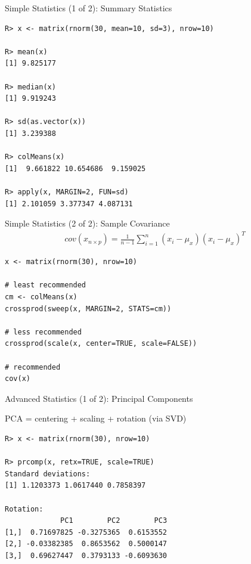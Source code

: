 \begin{frame}[fragile]
  \begin{exampleblock}{Simple Statistics (1 of 2): Summary Statistics}\pause
  
\begin{lstlisting}[backgroundcolor=\color{white},basicstyle=\ttfamily\color{
dkgray}\scriptsize,keywordstyle=\color{black}, 
  commentstyle=\color{orange},stringstyle=\color{mauve}]
R> x <- matrix(rnorm(30, mean=10, sd=3), nrow=10)

R> mean(x)
[1] 9.825177

R> median(x)
[1] 9.919243

R> sd(as.vector(x))
[1] 3.239388

R> colMeans(x)
[1]  9.661822 10.654686  9.159025

R> apply(x, MARGIN=2, FUN=sd)
[1] 2.101059 3.377347 4.087131
\end{lstlisting}
  \end{exampleblock}
\end{frame}


\begin{frame}[fragile]
  \begin{exampleblock}{Simple Statistics (2 of 2): Sample Covariance}\pause
  \begin{align*}
    cov(x_{n\times p}) = 
\frac{1}{n-1}\sum_{i=1}^n\left(x_i-\mu_x\right)\left(x_i-\mu_x\right)^T
  \end{align*}
  \begin{lstlisting}
x <- matrix(rnorm(30), nrow=10)

# least recommended
cm <- colMeans(x)
crossprod(sweep(x, MARGIN=2, STATS=cm))

# less recommended
crossprod(scale(x, center=TRUE, scale=FALSE))

# recommended
cov(x)
\end{lstlisting}
  \end{exampleblock}
\end{frame}


\begin{frame}[fragile]
  \begin{exampleblock}{Advanced Statistics (1 of 2): Principal Components}\pause
  \begin{center}
    PCA = centering + scaling + rotation (via SVD)
  \end{center}
  
\begin{lstlisting}[backgroundcolor=\color{white},basicstyle=\ttfamily\color{
dkgray}\scriptsize,keywordstyle=\color{black}, 
  commentstyle=\color{orange},stringstyle=\color{mauve}]
R> x <- matrix(rnorm(30), nrow=10)

R> prcomp(x, retx=TRUE, scale=TRUE)
Standard deviations:
[1] 1.1203373 1.0617440 0.7858397

Rotation:
             PC1        PC2        PC3
[1,]  0.71697825 -0.3275365  0.6153552
[2,] -0.03382385  0.8653562  0.5000147
[3,]  0.69627447  0.3793133 -0.6093630
\end{lstlisting}
  \end{exampleblock}
\end{frame}

